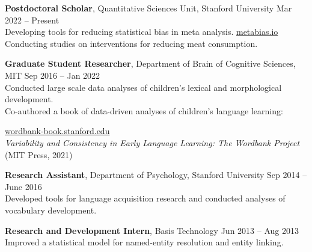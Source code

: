 \documentclass[11pt,]{article}
\newcommand{\hlink}[1]{
  \hfill \small \href{http://#1}{#1} \normalsize
}
\begin{document}
\textbf{Postdoctoral Scholar}, Quantitative Sciences Unit, Stanford
University \hfill Mar 2022 -- Present\\
\hspace*{0.333em}\hspace*{0.333em}\hspace*{0.333em}Developing tools for
reducing statistical bias in meta analysis. \hlink{metabias.io}\\
\hspace*{0.333em}\hspace*{0.333em}\hspace*{0.333em}Conducting studies on
interventions for reducing meat consumption.

\textbf{Graduate Student Researcher}, Department of Brain of Cognitive
Sciences, MIT \hfill Sep 2016 -- Jan 2022\\
\hspace*{0.333em}\hspace*{0.333em}\hspace*{0.333em}Conducted large scale
data analyses of children's lexical and morphological development.\\
\hspace*{0.333em}\hspace*{0.333em}\hspace*{0.333em}Co-authored a book of
data-driven analyses of children's language learning:
\hlink{wordbank-book.stanford.edu}\\
\hspace*{0.333em}\hspace*{0.333em}\hspace*{0.333em}\hspace*{0.333em}\hspace*{0.333em}\hspace*{0.333em}\hspace*{0.333em}\emph{Variability
and Consistency in Early Language Learning: The Wordbank Project} (MIT
Press, 2021)

\textbf{Research Assistant}, Department of Psychology, Stanford
University \hfill Sep 2014 -- June 2016\\
\hspace*{0.333em}\hspace*{0.333em}\hspace*{0.333em}Developed tools for
language acquisition research and conducted analyses of vocabulary
development.

\textbf{Research and Development Intern}, Basis Technology \hfill Jun
2013 -- Aug 2013\\
\hspace*{0.333em}\hspace*{0.333em}\hspace*{0.333em}Improved a
statistical model for named-entity resolution and entity linking.
\end{document}
